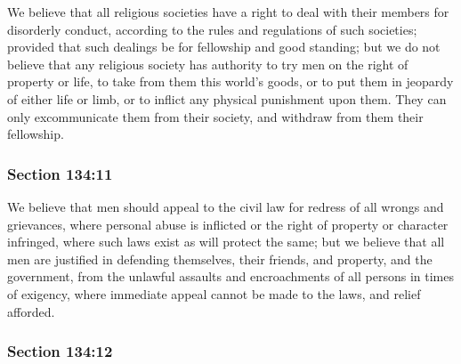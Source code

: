 		We believe that all religious societies have a right to deal with their members for disorderly conduct, according to the rules and regulations of such societies; provided that such dealings be for fellowship and good standing; but we do not believe that any religious society has authority to try men on the right of property or life, to take from them this world's goods, or to put them in jeopardy of either life or limb, or to inflict any physical punishment upon them.  They can only excommunicate them from their society, and withdraw from them their fellowship.


	\subsubsection{Section 134:11} %
		\label{DC134-11}

		We believe that men should appeal to the civil law for redress of all wrongs and grievances, where personal abuse is inflicted or the right of property or character infringed, where such laws exist as will protect the same; but we believe that all men are justified in defending themselves, their friends, and property, and the government, from the unlawful assaults and encroachments of all persons in times of exigency, where immediate appeal cannot be made to the laws, and relief afforded.


	\subsubsection{Section 134:12} %
		\label{DC134-12}

